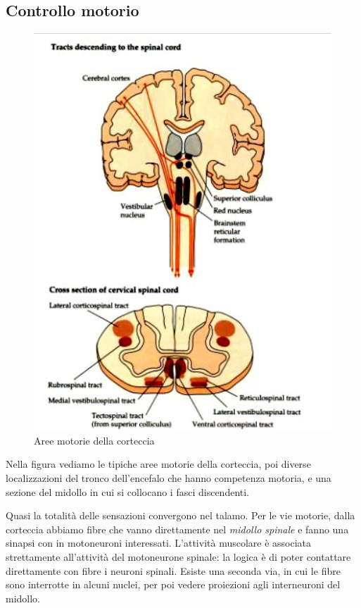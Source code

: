 \documentclass[a4paper,12pt]{article}
\begin{document}
\subsection{Controllo motorio}
\begin{figure}[H]
\centering
\includegraphics[scale=0.35]{immagine/corteccia_motoria.jpg}
\caption{Aree motorie della corteccia}
\end{figure}

Nella figura vediamo le tipiche aree motorie della corteccia, poi diverse localizzazioni del tronco dell'encefalo che hanno competenza motoria, e una sezione del midollo in cui si collocano i fasci discendenti.

Quasi la totalità delle sensazioni convergono nel talamo. Per le vie motorie, dalla corteccia abbiamo fibre che vanno direttamente nel \emph{midollo spinale} e fanno una sinapsi con in motoneuroni interessati. L'attività muscolare è associata strettamente all'attività del motoneurone spinale: la logica è di poter contattare direttamente con fibre i neuroni spinali. Esiste una seconda via, in cui le fibre sono interrotte in alcuni nuclei, per poi vedere proiezioni agli interneuroni del midollo.
\end{document}
